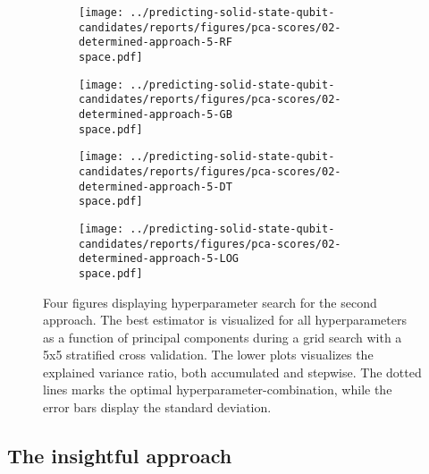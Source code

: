 \begin{figure}[!tbp]
  \begin{subfigure}[b]{0.5\textwidth}
    \texttt{[image: ../predicting-solid-state-qubit-candidates/reports/figures/pca-scores/02-determined-approach-5-RF\\space.pdf]}
    \caption{}
    \label{fig:q2-GB}
  \end{subfigure}%
  \hfill
  \begin{subfigure}[b]{0.5\textwidth}
    \texttt{[image: ../predicting-solid-state-qubit-candidates/reports/figures/pca-scores/02-determined-approach-5-GB\\space.pdf]}
    \caption{}
    \label{fig:q2-RF}
  \end{subfigure}

  \begin{subfigure}[b]{0.5\textwidth}
    \texttt{[image: ../predicting-solid-state-qubit-candidates/reports/figures/pca-scores/02-determined-approach-5-DT\\space.pdf]}
    \caption{}
    \label{fig:q2-DT}
  \end{subfigure}%
  \hfill
  \begin{subfigure}[b]{0.5\textwidth}
    \texttt{[image: ../predicting-solid-state-qubit-candidates/reports/figures/pca-scores/02-determined-approach-5-LOG\\space.pdf]}
    \caption{}
    \label{fig:q2-LOG}
  \end{subfigure}
  \vspace*{-95mm}
  \caption{{Four figures displaying hyperparameter search for the second approach. The best estimator is visualized for all hyperparameters as a function of principal components during a grid search with a 5x5 stratified cross validation. The lower plots visualizes the explained variance ratio, both accumulated and stepwise. The dotted lines marks the optimal hyperparameter-combination, while the error bars display the standard deviation. }}
\end{figure}

\clearpage

\subsection{The insightful approach}


